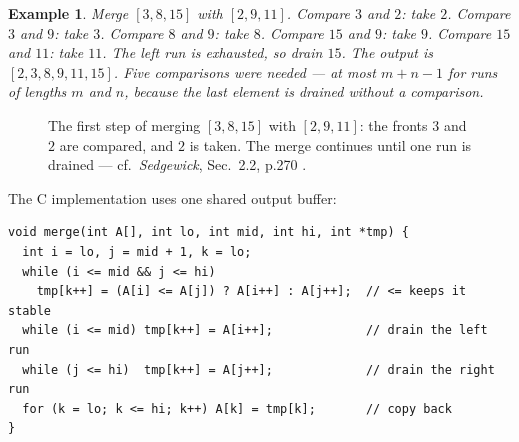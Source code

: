 \documentclass[11pt]{article}
\newtheorem{example}{Example}[section]
\begin{document}
\begin{example}
Merge $[3,8,15]$ with $[2,9,11]$. Compare $3$ and $2$: take $2$. Compare $3$ and $9$: take $3$. Compare $8$ and $9$: take $8$. Compare $15$ and $9$: take $9$. Compare $15$ and $11$: take $11$. The left run is exhausted, so drain $15$. The output is $[2,3,8,9,11,15]$. Five comparisons were needed --- at most $m+n-1$ for runs of lengths $m$ and $n$, because the last element is drained without a comparison.
\end{example}

\begin{figure}[h]
  \centering
  \caption{The first step of merging $[3,8,15]$ with $[2,9,11]$: the fronts $3$ and $2$ are compared, and $2$ is taken. The merge continues until one run is drained --- cf.\ \textit{Sedgewick}, Sec.~2.2, p.270 \cite{Sedgewick2011_algorithms}.}
\end{figure}

The C implementation uses one shared output buffer:

\begin{verbatim}
void merge(int A[], int lo, int mid, int hi, int *tmp) {
  int i = lo, j = mid + 1, k = lo;
  while (i <= mid && j <= hi)
    tmp[k++] = (A[i] <= A[j]) ? A[i++] : A[j++];  // <= keeps it stable
  while (i <= mid) tmp[k++] = A[i++];             // drain the left run
  while (j <= hi)  tmp[k++] = A[j++];             // drain the right run
  for (k = lo; k <= hi; k++) A[k] = tmp[k];       // copy back
}
\end{verbatim}
\end{document}
